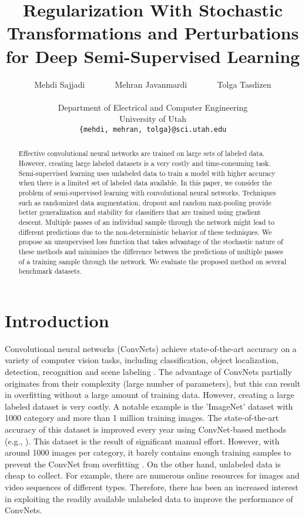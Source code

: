 \documentclass{article}
\title{Regularization With Stochastic Transformations and Perturbations for Deep Semi-Supervised Learning}
\author{
  Mehdi Sajjadi\,\,\,\,\,\,\,\,\,\,\,\,\,\,\,\,\,\,\,\,\,\,Mehran Javanmardi\,\,\,\,\,\,\,\,\,\,\,\,\,\,\,\,\,\,\,\,\,\,Tolga Tasdizen\\
\\
  Department of Electrical and Computer Engineering\\
  University of Utah\\
  \texttt{\{mehdi, mehran, tolga\}@sci.utah.edu} \\
}
\begin{document}
\maketitle

\begin{abstract}
Effective convolutional neural networks are trained on large sets of labeled data. However, creating large labeled datasets is a very costly and time-consuming task. Semi-supervised learning uses unlabeled data to train a model with higher accuracy when there is a limited set of labeled data available. In this paper, we consider the problem of semi-supervised learning with convolutional neural networks. Techniques such as randomized data augmentation, dropout and random max-pooling provide better generalization and stability for classifiers that are trained using gradient descent. Multiple passes of an individual sample through the network might lead to different predictions due to the non-deterministic behavior of these techniques. We propose an unsupervised loss function that takes advantage of the stochastic nature of these methods and minimizes the difference between the predictions of multiple passes of a training sample through the network. We evaluate the proposed method on several benchmark datasets.
\end{abstract}
\section{Introduction}
Convolutional neural networks (ConvNets) \cite{le1990handwritten,lecun1998gradient} achieve state-of-the-art accuracy on a variety of computer vision tasks, including classification, object localization, detection, recognition and scene labeling \cite{sermanet2013overfeat, long2015fully}. The advantage of ConvNets partially originates from their complexity (large number of parameters), but this can result in overfitting without a large amount of training data. However, creating a large labeled dataset is very costly. A notable example is the ’ImageNet’ \cite{berg2010large} dataset with 1000 category and more than 1 million training images. The state-of-the-art accuracy of this dataset is improved every year using ConvNet-based methods (e.g., \cite{szegedy2015going, krizhevsky2012imagenet}). This dataset is the result of significant manual effort. However, with around 1000 images per category, it barely contains enough training samples to prevent the ConvNet from overfitting \cite{krizhevsky2012imagenet}. On the other hand, unlabeled data is cheap to collect. For example, there are numerous online resources for images and video sequences of different types. Therefore, there has been an increased interest in exploiting the readily available unlabeled data to improve the performance of ConvNets.
\end{document}
